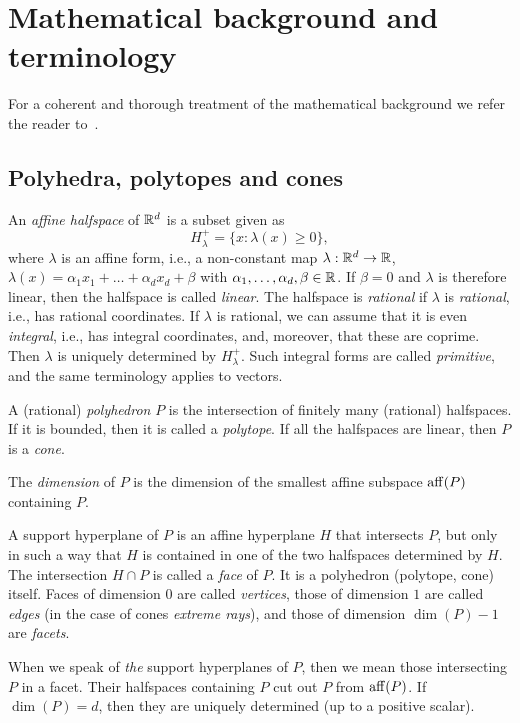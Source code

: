 \appendix

\section{Mathematical background and terminology}\label{AppBackground}

For a coherent and thorough treatment of the mathematical background we refer the reader to~\cite{BG}.

\subsection{Polyhedra, polytopes and cones}

An \emph{affine halfspace} of ${\mathbb R}^d$ is a subset given as
$$
H_\lambda^+=\{x: \lambda(x)\ge 0\},
$$
where $\lambda$ is an affine form, i.e., a non-constant map $\lambda:{\mathbb R}^d\to{\mathbb R}$, $\lambda(x)=\alpha_1x_1+\dots+\alpha_dx_d+\beta$ with $\alpha_1,\dots,\alpha_d,\beta\in{\mathbb R}$. If $\beta=0$ and $\lambda$ is therefore linear, then the halfspace is called \emph{linear}. The halfspace is \emph{rational} if $\lambda$ is \emph{rational}, i.e., has rational coordinates. If $\lambda$ is rational, we can assume that it is even \emph{integral}, i.e., has integral coordinates, and, moreover, that these are coprime. Then $\lambda$ is uniquely determined by $H_\lambda^+$. Such integral forms are called \emph{primitive}, and the same terminology applies to vectors.

\begin{definition}
	A (rational) \emph{polyhedron} $P$ is the intersection of finitely many (rational) halfspaces. If it is bounded, then it is called a \emph{polytope}. If all the halfspaces are linear, then $P$ is a \emph{cone}.
	
	The \emph{dimension} of $P$ is the dimension of the smallest affine subspace $\operatorname{aff}(P)$ containing $P$.
\end{definition}


A support hyperplane of $P$ is an affine hyperplane $H$ that intersects $P$, but only in such a way that $H$ is contained in one of the two halfspaces determined by $H$. The intersection $H\cap P$ is called a \emph{face} of $P$. It is a polyhedron (polytope, cone) itself. Faces of dimension $0$ are called \emph{vertices}, those of dimension $1$ are called \emph{edges} (in the case of cones \emph{extreme rays}), and those of dimension $\dim(P)-1$ are \emph{facets}.

When we speak of \emph{the} support hyperplanes of $P$, then we mean those intersecting $P$ in a facet. Their halfspaces containing $P$ cut out $P$ from $\operatorname{aff}(P)$. If $\dim(P)=d$, then they are uniquely determined (up to a positive scalar).


